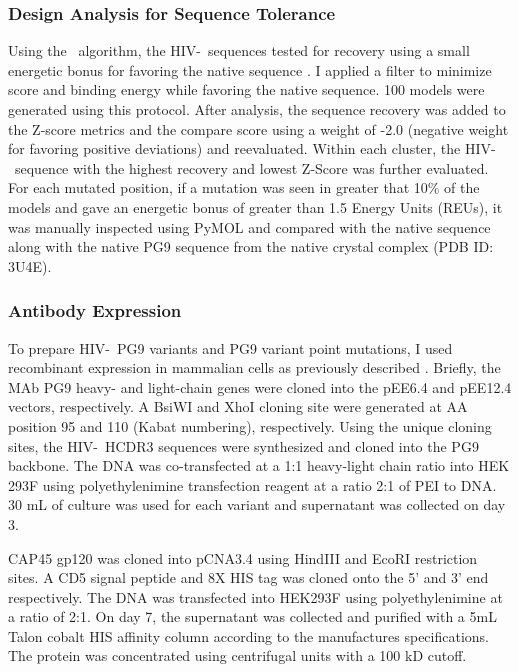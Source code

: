 \subsubsection{Design Analysis for Sequence Tolerance}
Using the \rosettadesign~algorithm, the HIV-\naive~sequences tested for recovery using a small energetic bonus for favoring the native sequence \citep{Kuhlman:2000tc}. I applied a filter to minimize score and binding energy while favoring the native sequence. 100 models were generated using this protocol. After analysis, the sequence recovery was added to the Z-score metrics and the compare score using a weight of -2.0 (negative weight for favoring positive deviations) and reevaluated. Within each cluster, the HIV-\naive~sequence with the highest recovery and lowest Z-Score was further evaluated. For each mutated position, if a mutation was seen in greater that 10\% of the models and gave an energetic bonus of greater than 1.5 \rosetta Energy Units (REUs), it was manually inspected using PyMOL and compared with the native sequence along with the native PG9 sequence from the native crystal complex (PDB ID: 3U4E).

\subsubsection{Antibody Expression}
To prepare HIV-\naive~PG9 variants and PG9 variant point mutations, I used recombinant expression in mammalian cells as previously described \citep{Xu:2010da}. Briefly, the MAb PG9 heavy- and light-chain genes were cloned into the pEE6.4 and pEE12.4 vectors, respectively. A BsiWI and XhoI cloning site were generated at AA position 95 and 110 (Kabat numbering), respectively. Using the unique cloning sites, the HIV-\naive~HCDR3 sequences were synthesized and cloned into the PG9 backbone. The DNA was co-transfected at a 1:1 heavy-light chain ratio into HEK 293F using polyethylenimine transfection reagent at a ratio 2:1 of PEI to DNA. 30 mL of culture was used for each variant and supernatant was collected on day 3.

CAP45 gp120 was cloned into pCNA3.4 using HindIII and EcoRI restriction sites. A CD5 signal peptide and 8X HIS tag was cloned onto the 5' and 3' end respectively. The DNA was transfected into HEK293F using polyethylenimine at a ratio of 2:1. On day 7, the supernatant was collected and purified with a 5mL Talon cobalt HIS affinity column according to the manufactures specifications. The protein was concentrated using centrifugal units with a 100 kD cutoff.

